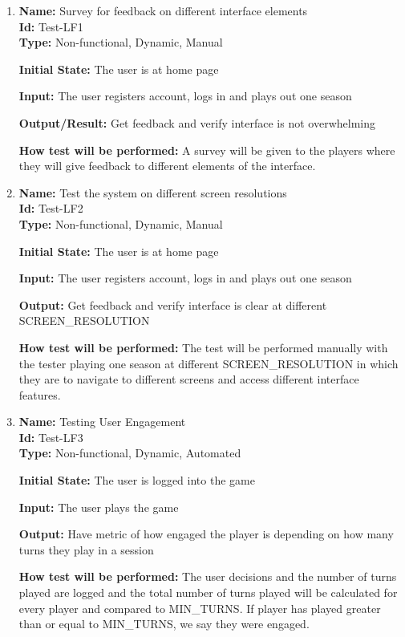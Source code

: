 \documentclass[12pt, titlepage]{article}
\begin{document}
\begin{enumerate}

\item{\textbf{Name:} Survey for feedback on different interface elements\\} \label{Test-LF1}%
\textbf{Id:} Test-LF1\\

\textbf{Type:} Non-functional, Dynamic, Manual
					
\textbf{Initial State: }The user is at home page
					
\textbf{Input:} The user registers account, logs in and plays out one season
					
\textbf{Output/Result:} Get feedback and verify interface is not overwhelming
					
\textbf{How test will be performed:} A survey will be given to the players where they will give feedback to different elements of the interface.
					
\item{\textbf{Name: }Test the system on different screen resolutions \\}\label{Test-LF2}
\textbf{Id: }Test-LF2\\

\textbf{Type: }Non-functional, Dynamic, Manual
					
\textbf{Initial State:} The user is at home page
					
\textbf{Input:} The user registers account, logs in and plays out one season
					
\textbf{Output:} Get feedback and verify interface is clear at different SCREEN\_RESOLUTION %
					
\textbf{How test will be performed:} The test will be performed manually with the tester playing one season at different SCREEN\_RESOLUTION in which they are to navigate to different screens and access different interface features.

\item{\textbf{Name: }Testing User Engagement \\}\label{Test-LF3}
\textbf{Id: }Test-LF3\\

\textbf{Type:} Non-functional, Dynamic, Automated
					
\textbf{Initial State:} The user is logged into the game
					
\textbf{Input:} The user plays the game
					
\textbf{Output: }Have metric of how engaged the player is depending on how many turns they play in a session
					
\textbf{How test will be performed:} The user decisions and the number of turns played are logged and the total number of turns played will be calculated for every player and compared to MIN\_TURNS. If player has played greater than or equal to MIN\_TURNS, we say they were engaged.


\end{enumerate}
\end{document}

